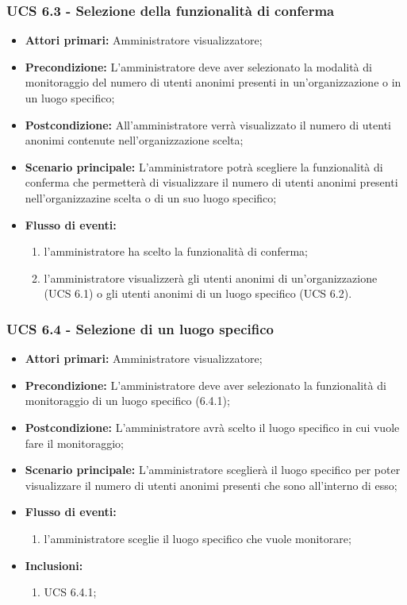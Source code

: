 \subsubsection{UCS 6.3 - Selezione della funzionalità di conferma}%
\begin{itemize}
	\item \textbf{Attori primari:} Amministratore visualizzatore;
	\item \textbf{Precondizione:} L'amministratore deve aver selezionato la modalità di monitoraggio del numero di utenti anonimi presenti in un'organizzazione o in un luogo specifico;
	\item \textbf{Postcondizione:} All'amministratore verrà visualizzato il numero di utenti anonimi contenute nell'organizzazione scelta;
	\item \textbf{Scenario principale:} L'amministratore potrà scegliere la funzionalità di conferma che permetterà di visualizzare il numero di utenti anonimi presenti nell'organizzazine scelta o di un suo luogo specifico;
	\item \textbf{Flusso di eventi:} 
	\begin{enumerate}
		\item l'amministratore ha scelto la funzionalità di conferma;
		\item l'amministratore visualizzerà gli utenti anonimi di un'organizzazione (UCS 6.1) o gli utenti anonimi di un luogo specifico (UCS 6.2).
	\end{enumerate}
\end{itemize}

\subsubsection{UCS 6.4 - Selezione di un luogo specifico}%
\begin{itemize}
	\item \textbf{Attori primari:} Amministratore visualizzatore;
	\item \textbf{Precondizione:} L'amministratore deve aver selezionato la funzionalità di monitoraggio di un luogo specifico (6.4.1);
	\item \textbf{Postcondizione:} L'amministratore avrà scelto il luogo specifico in cui vuole fare il monitoraggio;
	\item \textbf{Scenario principale:} L'amministratore sceglierà il luogo specifico per poter visualizzare il numero di utenti anonimi presenti che sono all'interno di esso;
	\item \textbf{Flusso di eventi:} 
	\begin{enumerate}
		\item l'amministratore sceglie il luogo specifico che vuole monitorare;
	\end{enumerate}
	\item \textbf{Inclusioni:}
	\begin{enumerate}
		\item UCS 6.4.1;
	\end{enumerate}
\end{itemize}

